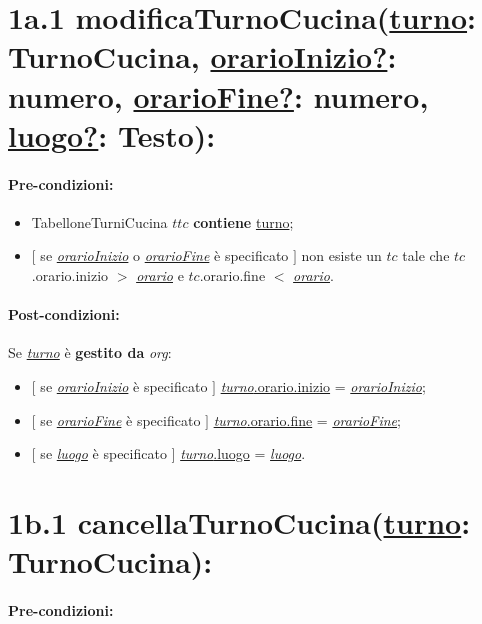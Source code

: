 \section*{1a.1 modificaTurnoCucina(\underline{turno}: TurnoCucina, \underline{orarioInizio?}: numero, \underline{orarioFine?}: numero, \underline{luogo?}: Testo):}

\paragraph{Pre-condizioni:}

\begin{itemize}
 \item TabelloneTurniCucina $ttc$ \textbf{contiene} \underline{turno};
 \item $[$ se \underline{\textit{orarioInizio}} o \underline{\textit{orarioFine}} è specificato $]$ non esiste un $tc$ tale che $tc$.orario.inizio $>$ \underline{\textit{orario}} e $tc$.orario.fine $<$ \underline{\textit{orario}}.
\end{itemize}

\paragraph{Post-condizioni:} Se \underline{\textit{turno}} è \textbf{gestito da} \textit{org}:

\begin{itemize}
    \item $[$ se \underline{\textit{orarioInizio}} è specificato $]$ \underline{\textit{turno}.orario.inizio} = \underline{\textit{orarioInizio}};

    \item $[$ se \underline{\textit{orarioFine}} è specificato $]$ \underline{\textit{turno}.orario.fine} = \underline{\textit{orarioFine}};

    \item $[$ se \underline{\textit{luogo}} è specificato $]$ \underline{\textit{turno}.luogo} = \underline{\textit{luogo}}.

\end{itemize}

\section*{1b.1 cancellaTurnoCucina(\underline{turno}: TurnoCucina):}

\paragraph{Pre-condizioni:}


